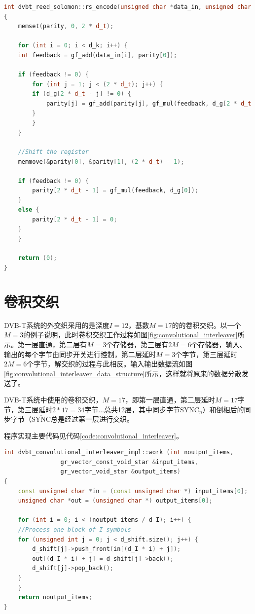 		\begin{lstlisting}[caption = {RS编码}, label = {code:rs_encode}, language = C++ ]
int dvbt_reed_solomon::rs_encode(unsigned char *data_in, unsigned char *parity)
{
	memset(parity, 0, 2 * d_t);

	for (int i = 0; i < d_k; i++) {
	int feedback = gf_add(data_in[i], parity[0]);

	if (feedback != 0) {
		for (int j = 1; j < (2 * d_t); j++) {
		if (d_g[2 * d_t - j] != 0) {
			parity[j] = gf_add(parity[j], gf_mul(feedback, d_g[2 * d_t - j]));
		}
		}
	}

	//Shift the register
	memmove(&parity[0], &parity[1], (2 * d_t) - 1);

	if (feedback != 0) {
		parity[2 * d_t - 1] = gf_mul(feedback, d_g[0]);
	}
	else {
		parity[2 * d_t - 1] = 0;
	}
	}

	return (0);
}
		\end{lstlisting}
	\section{卷积交织}
		\par DVB-T系统的外交织采用的是深度$I=12$，基数$M=17$的的卷积交织。以一个$M=3$的例子说明，此时卷积交织工作过程如图\ref{fig:convolutional_interleaver}所示。第一层直通，第二层有$M=3$个存储器，第三层有$2M=6$个存储器，输入、输出的每个字节由同步开关进行控制，第二层延时$M=3$个字节，第三层延时$2M=6$个字节，解交织的过程与此相反。输入输出数据流如图\ref{fig:convolutional_interleaver_data_structure}所示\cite{用FPGA实现DVB标准中的卷积交织_刘静}，这样就将原来的数据分散发送了。
		
		
		\par DVB-T系统中使用的卷积交织，$M=17$，即第一层直通，第二层延时$M=17$字节，第三层延时$2*17=34$字节...总共12层，其中同步字节$\text{SYNC}_n$）和倒相后的同步字节（$\overline{\text{SYNC}}$总是经过第一层进行交织。
		\par 程序实现主要代码见代码\ref{code:convolutional_interleaver}。
		\begin{lstlisting}[caption = {卷积交织},label = {code:convolutional_interleaver},language = C++ ]
int dvbt_convolutional_interleaver_impl::work (int noutput_items,
				gr_vector_const_void_star &input_items,
				gr_vector_void_star &output_items)
{
	const unsigned char *in = (const unsigned char *) input_items[0];
	unsigned char *out = (unsigned char *) output_items[0];

	for (int i = 0; i < (noutput_items / d_I); i++) {
	//Process one block of I symbols
	for (unsigned int j = 0; j < d_shift.size(); j++) {
		d_shift[j]->push_front(in[(d_I * i) + j]);
		out[(d_I * i) + j] = d_shift[j]->back();
		d_shift[j]->pop_back();
	}
	}
	return noutput_items;
}
		\end{lstlisting}
